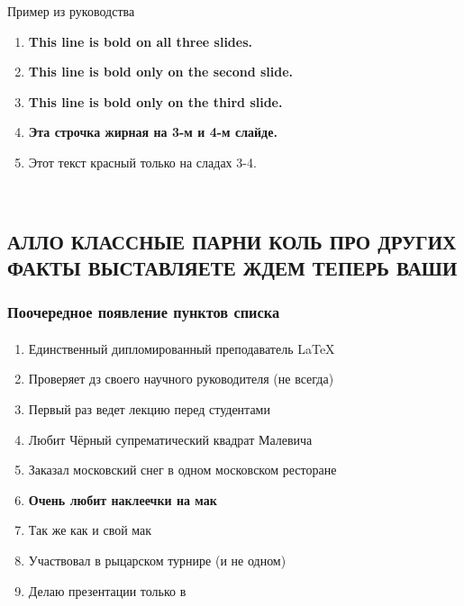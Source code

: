 \documentclass[t, dvipsnames]{beamer}  %
\begin{document}
\begin{frame}{Пример из руководства}
\begin{enumerate}
   \item  \textbf{This line is bold on all three slides.}
    \item \textbf<2>{This line is bold only on the second slide.}
   \item  \textbf<3>{\alert<4>{This line is bold only on the third slide.}}
   \item \textbf<3,4>{Эта строчка жирная на 3-м и 4-м слайде.}
	 \item {} Этот текст красный только на сладах 3-4.
    \end{enumerate}
         \\
\end{frame}

\subsection*{АЛЛО КЛАССНЫЕ ПАРНИ КОЛЬ ПРО ДРУГИХ ФАКТЫ ВЫСТАВЛЯЕТЕ ЖДЕМ ТЕПЕРЬ ВАШИ}
\begin{frame}[shrink=5]
	\frametitle{Поочередное появление пунктов списка}
	\framesubtitle{\insertsubsection}
     \begin{enumerate}
        \item<1-> \alert<3-5>{Единственный дипломированный преподаватель LaTeX}
        \item<2-> Проверяет дз своего научного руководителя (не всегда)
        \item<3-> Первый раз ведет лекцию перед студентами
    	\item<4->  {Любит Чёрный супрематический квадрат Малевича}
    	\item<5-> Заказал московский снег в одном московском ресторане 
    	\item<6-> \textbf<3>{Очень любит наклеечки на мак}
    	\item<7-> Так же как и свой мак
    	\item<8-> Участвовал в рыцарском турнире (и не одном)
    	\item<9-> Делаю презентации только в \insertlogo
    \end{enumerate}
\end{frame}
\end{document}
